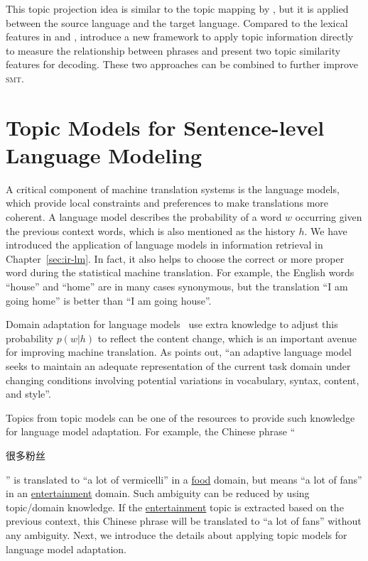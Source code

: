 This topic projection idea is similar to the topic mapping by
\citet{su-12}, but it is applied between the source language and the
target language. Compared to the lexical features in
\citet{Eidelman-12} and \citet{hu-14}, \citet{xiao-12} introduce a new
framework to apply topic information directly to measure the relationship between phrases and present two topic similarity features for decoding. These two approaches can
be combined to further improve \textsc{smt}.

\section{Topic Models for Sentence-level Language Modeling}


A critical component of machine translation systems is the language
models, which provide local constraints and preferences to make
translations more coherent. A language model describes the probability
of a word $w$ occurring given the previous context words, which is
also mentioned as the history $h$. We have introduced the application
of language models in information retrieval in
Chapter~\ref{sec:ir-lm}. In fact, it also helps to choose the correct
or more proper word during the statistical machine translation. For
example, the English words ``house'' and ``home'' are in many cases synonymous, but the translation ``I am going home'' is better than
``I am going house''.

Domain adaptation for language models~\citep{Bellegarda-04,wood-09}
use extra knowledge to adjust this probability $p(w|h)$ to reflect
the content change, which is an important avenue for improving machine
translation. As \citet{Bellegarda-04} points out, ``an adaptive
language model seeks to maintain an adequate representation of the
current task domain under changing conditions involving potential
variations in vocabulary, syntax, content, and style''.

Topics from topic models can be one of the resources to provide such
knowledge for language model adaptation. For example, the Chinese
phrase ``\begin{CJK*}{UTF8}{gbsn}很多粉丝\end{CJK*}'' is translated to
  ``a lot of vermicelli'' in a \underline{food} domain, but means ``a
  lot of fans'' in an \underline{entertainment} domain. Such ambiguity
  can be reduced by using topic/domain knowledge. If the \underline{entertainment} topic is extracted based on
  the previous context, this Chinese phrase will be translated to ``a
  lot of fans'' without any ambiguity. Next, we introduce the details
  about applying topic models for language model adaptation.

